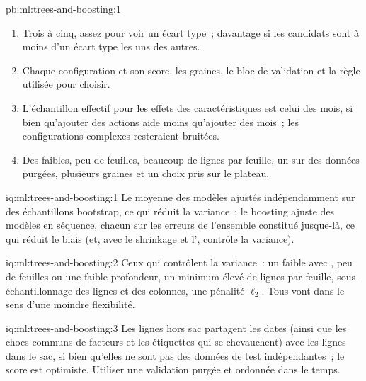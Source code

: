 \begin{solution}{pb:ml:trees-and-boosting:1}
\begin{enumerate}
\item Trois à cinq, assez pour voir un écart type~; davantage si les candidats sont à moins d'un écart type les uns des autres.
\item Chaque configuration et son score, les graines, le bloc de validation et la règle utilisée pour choisir.
\item L'échantillon effectif pour les effets des caractéristiques est celui des mois, si bien qu'ajouter des actions aide moins qu'ajouter des mois~;
les configurations complexes resteraient bruitées.
\item Des  faibles, peu de feuilles, beaucoup de lignes par feuille, un  sur des données purgées, plusieurs graines et un choix
pris sur le plateau.
\end{enumerate}
\end{solution}

\begin{solution}{iq:ml:trees-and-boosting:1}
Le  moyenne des modèles ajustés indépendamment sur des échantillons bootstrap, ce qui réduit la variance~; le boosting ajuste des modèles en séquence,
chacun sur les erreurs de l'ensemble constitué jusque-là, ce qui réduit le biais (et, avec le shrinkage et l', contrôle la variance).
\end{solution}

\begin{solution}{iq:ml:trees-and-boosting:2}
Ceux qui contrôlent la variance~: un  faible avec , peu de feuilles ou une faible profondeur, un minimum élevé de
lignes par feuille, sous-échantillonnage des lignes et des colonnes, une pénalité $\ell_2$. Tous vont dans le sens d'une moindre flexibilité.
\end{solution}

\begin{solution}{iq:ml:trees-and-boosting:3}
Les lignes hors sac partagent les dates (ainsi que les chocs communs de facteurs et les étiquettes qui se chevauchent) avec les lignes dans le sac, si bien qu'elles ne sont pas des
données de test indépendantes~; le score est optimiste. Utiliser une validation purgée et ordonnée dans le temps.
\end{solution}

